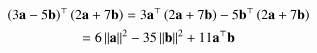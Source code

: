 \begin{multline}
    \left(3\mathbf{a}-5\mathbf{b}\right)^{\top}\left(2\mathbf{a}+7\mathbf{b}\right)= 3\mathbf{a}^{\top}\left(2\mathbf{a}+7\mathbf{b}\right) - 5\mathbf{b}^{\top}\left(2\mathbf{a}+7\mathbf{b}\right)
    \\
     =6\left\lVert\mathbf{a}\right\rVert^2-35\left\lVert\mathbf{b}\right\rVert^2+11\mathbf{a}^{\top}\mathbf{b}
\end{multline}
